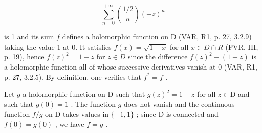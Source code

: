 \[
\sum_ {n = 0} ^ {+ \infty} \binom {1 / 2} {n} (- z) ^ {n}
\]

is 1 and its sum \(f\) defines a holomorphic function on D (VAR, R1, p. 27, 3.2.9) taking the value 1 at 0. It satisfies \(f(x)=\sqrt{1-x}\) for all \(x \in D \cap R\) (FVR, III, p. 19), hence \(f(z)^{2} = 1 - z\) for \(z \in D\) since the difference \(f(z)^{2} - (1 - z)\) is a holomorphic function all of whose successive derivatives vanish at 0 (VAR, R1, p. 27, 3.2.5). By definition, one verifies that \(f^{*} = f\) .

Let \(g\) a holomorphic function on D such that \(g(z)^2 = 1 - z\) for all \(z \in \mathrm{D}\) and such that \(g(0) = 1\) . The function \(g\) does not vanish and the continuous function \(f / g\) on D takes values in \(\{-1, 1\}\) ; since D is connected and \(f(0) = g(0)\) , we have \(f = g\) .
\relax{}
